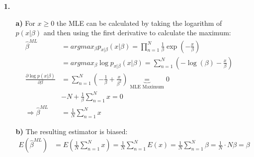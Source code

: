 \documentclass[a4paper,11pt]{article}
\author{\authorinfotitle}
\title{\titleinfo}
\date{\today}
\begin{document}
	\maketitle
	\begin{enumerate}
		\item[\textbf{1.}]
		
		\begin{enumerate}
		\item[\textbf{a)}]
		For $x \geq 0$ the MLE can be calculated by taking the logarithm of $p(x|\beta)$ and then using the first derivative to calculate the maximum:
		\begin{align*}
		\hat{\beta}^{ML} &= argmax_\beta p_{x|\beta}(x|\beta) = \prod_{n=1}^{N}\frac{1}{\beta}\exp(-\frac{x}{\beta}) \\
		&= argmax_\beta \log p_{x|\beta}(x|\beta) = \sum_{n=1}^{N} (-\log(\beta)-\frac{x}{\beta}) \\
		\frac{\partial \log p(x|\beta)}{\partial \beta} &= \sum_{n=1}^{N} (-\frac{1}{\beta}+\frac{x}{\beta^2}) \underbrace{=}_{\text{MLE Maximum}} 0 \\
		&-N + \frac{1}{\beta} \sum_{n=1}^{N} x = 0 \\
		\Rightarrow \hat{\beta}^{ML} &= \frac{1}{N} \sum_{n=1}^{N} x
		\end{align*}
		\item[\textbf{b)}]
		The resulting estimator is biased:
		\begin{align*}
		E(\hat{\beta}^{ML}) &= E(\frac{1}{N} \sum_{n=1}^{N} x) = \frac{1}{N} \sum_{n=1}^{N} E(x) = \frac{1}{N} \sum_{n=1}^{N} \beta = \frac{1}{N} \cdot N\beta = \beta
		\end{align*}
		\end{enumerate}

	\end{enumerate}
\end{document}
